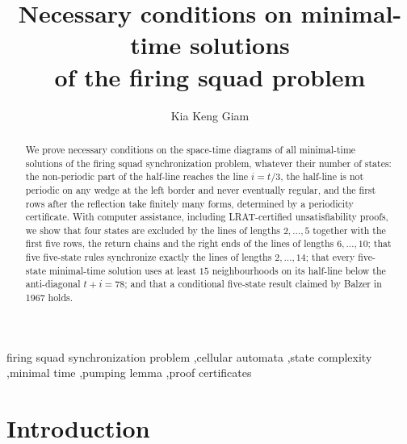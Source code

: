 \documentclass[3p]{elsarticle}
\theoremstyle{definition}
\begin{document}
\begin{frontmatter}

\title{Necessary conditions on minimal-time solutions\\
of the firing squad problem}

\author[tjc]{Kia Keng Giam}


\begin{abstract}
We prove necessary conditions on the space-time diagrams of all minimal-time
solutions of the firing squad synchronization problem, whatever their number
of states: the non-periodic part of the half-line reaches the line $i=t/3$,
the half-line is not periodic on any wedge at the left border and never
eventually regular, and the first rows after the reflection take finitely many
forms, determined by a periodicity certificate. With computer assistance,
including LRAT-certified unsatisfiability proofs, we show that four states are
excluded by the lines of lengths $2,\dots,5$ together with the first five
rows, the return chains and the right ends of the lines of lengths
$6,\dots,10$; that five five-state rules synchronize exactly the lines of
lengths $2,\dots,14$; that every five-state minimal-time solution uses at
least $15$ neighbourhoods on its half-line below the anti-diagonal $t+i=78$;
and that a conditional five-state result claimed by Balzer in 1967 holds.
\end{abstract}

\begin{keyword}
firing squad synchronization problem \sep cellular automata \sep state
complexity \sep minimal time \sep pumping lemma \sep proof certificates
\end{keyword}

\end{frontmatter}

\section{Introduction}\label{sec:intro}
\end{document}
